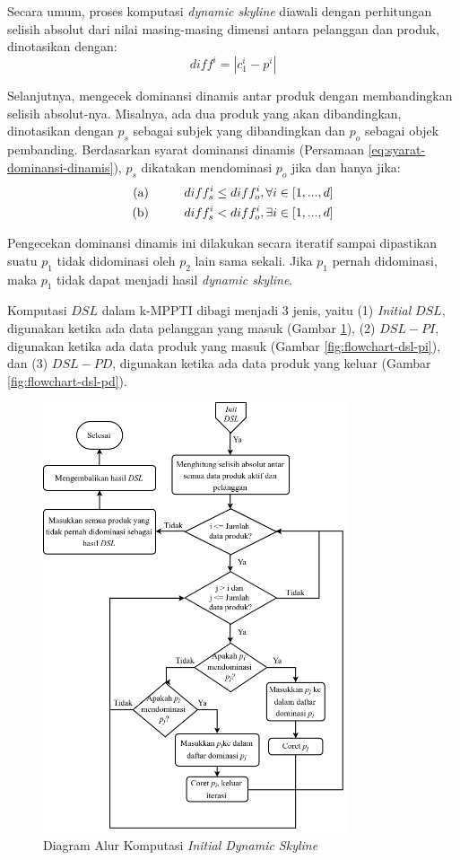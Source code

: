 Secara umum, proses komputasi \textit{dynamic skyline} diawali dengan perhitungan selisih absolut dari nilai masing-masing dimensi antara pelanggan dan produk, dinotasikan dengan:
\begin{equation}\label{eq:diff}
diff^i = |c_1^i - p^i|
\end{equation}

Selanjutnya, mengecek dominansi dinamis antar produk dengan membandingkan selisih absolut-nya. Misalnya, ada dua produk yang akan dibandingkan, dinotasikan dengan $p_s$ sebagai subjek yang dibandingkan dan $p_o$ sebagai objek pembanding. Berdasarkan syarat dominansi dinamis (Persamaan \ref{eq:syarat-dominansi-dinamis}), $p_s$ dikatakan mendominasi $p_o$ jika dan hanya jika:
\begin{equation}\label{eq:komputasi-dsl}
\begin{split}
\text{(a)} \hspace*{1cm} diff_s^i \leq diff_o^i, \forall i \in [1, ..., d] \\
\text{(b)} \hspace*{1cm} diff_s^i < diff_o^i, \exists i \in [1, ..., d]
\end{split}
\end{equation}

Pengecekan dominansi dinamis ini dilakukan secara iteratif sampai dipastikan suatu $p_1$ tidak didominasi oleh $p_2$ lain sama sekali. Jika $p_1$ pernah didominasi, maka $p_1$ tidak dapat menjadi hasil \textit{dynamic skyline}.

Komputasi $DSL$ dalam k-MPPTI dibagi menjadi 3 jenis, yaitu (1) \textit{Initial} $DSL$, digunakan ketika ada data pelanggan yang masuk (Gambar \ref{fig:flowchart-dsl-init}), (2) $DSL-PI$, digunakan ketika ada data produk yang masuk (Gambar \ref{fig:flowchart-dsl-pi}), dan (3) $DSL-PD$, digunakan ketika ada data produk yang keluar (Gambar \ref{fig:flowchart-dsl-pd}).

\begin{figure}[H]
	\centering
	\includegraphics[width=9cm]{assets/img/bab3/flowchart-dsl-init.png}
	\caption{Diagram Alur Komputasi \textit{Initial Dynamic Skyline}}
	\label{fig:flowchart-dsl-init}
\end{figure}

